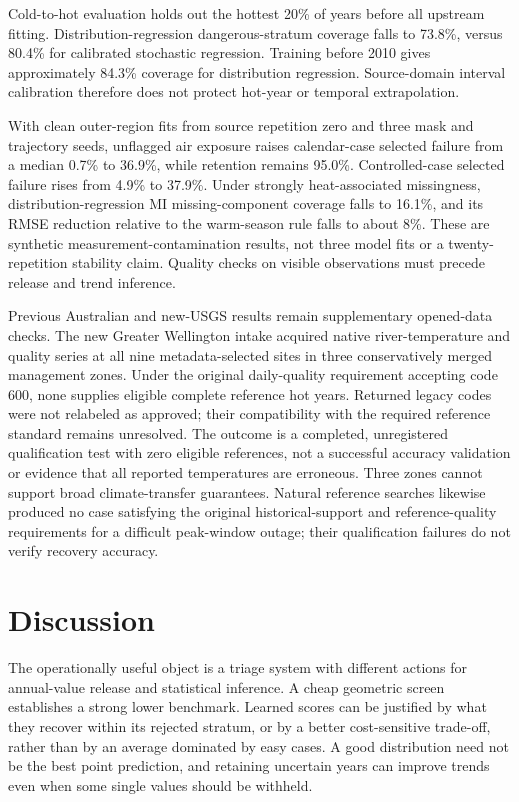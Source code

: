 \documentclass[draft,linenumbers]{agujournal2025}
\begin{document}
Cold-to-hot evaluation holds out the hottest 20\% of years before all upstream fitting. Distribution-regression dangerous-stratum coverage falls to 73.8\%, versus 80.4\% for calibrated stochastic regression. Training before 2010 gives approximately 84.3\% coverage for distribution regression. Source-domain interval calibration therefore does not protect hot-year or temporal extrapolation.

With clean outer-region fits from source repetition zero and three mask and trajectory seeds, unflagged air exposure raises calendar-case selected failure from a median 0.7\% to 36.9\%, while retention remains 95.0\%. Controlled-case selected failure rises from 4.9\% to 37.9\%. Under strongly heat-associated missingness, distribution-regression MI missing-component coverage falls to 16.1\%, and its RMSE reduction relative to the warm-season rule falls to about 8\%. These are synthetic measurement-contamination results, not three model fits or a twenty-repetition stability claim. Quality checks on visible observations must precede release and trend inference.

Previous Australian and new-USGS results remain supplementary opened-data checks. The new Greater Wellington intake acquired native river-temperature and quality series at all nine metadata-selected sites in three conservatively merged management zones. Under the original daily-quality requirement accepting code 600, none supplies eligible complete reference hot years. Returned legacy codes were not relabeled as approved; their compatibility with the required reference standard remains unresolved. The outcome is a completed, unregistered qualification test with zero eligible references, not a successful accuracy validation or evidence that all reported temperatures are erroneous. Three zones cannot support broad climate-transfer guarantees. Natural reference searches likewise produced no case satisfying the original historical-support and reference-quality requirements for a difficult peak-window outage; their qualification failures do not verify recovery accuracy.

\section{Discussion}
The operationally useful object is a triage system with different actions for annual-value release and statistical inference. A cheap geometric screen establishes a strong lower benchmark. Learned scores can be justified by what they recover within its rejected stratum, or by a better cost-sensitive trade-off, rather than by an average dominated by easy cases. A good distribution need not be the best point prediction, and retaining uncertain years can improve trends even when some single values should be withheld.
\end{document}
